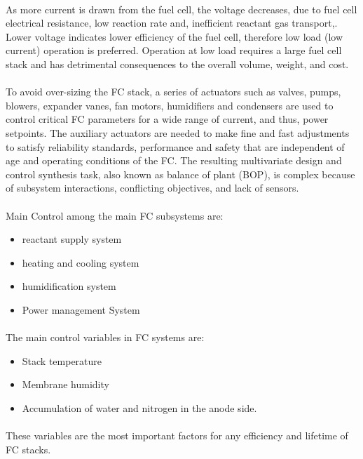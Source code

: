 \paragraph{}As more current is drawn from the fuel cell, the voltage decreases, due to fuel cell electrical resistance, low reaction rate and, inefficient reactant gas transport,. Lower voltage indicates lower efficiency of the fuel cell, therefore low load (low current) operation is preferred. Operation at low load requires a large fuel cell stack and has detrimental consequences to the overall volume, weight, and cost.
\paragraph{}To avoid over-sizing the FC stack, a series of actuators such as valves, pumps, blowers, expander vanes, fan motors, humidifiers and condensers are used to control critical FC parameters for a wide range of current, and thus, power setpoints. The auxiliary actuators are needed to make fine and fast adjustments to satisfy reliability standards, performance and safety that are independent of age and operating conditions of the FC. The resulting multivariate design and control synthesis task, also known as balance of plant (BOP), is complex because of subsystem interactions, conflicting objectives, and lack of sensors.
\paragraph{}Main Control among the main FC subsystems are:
\begin{itemize}
\item reactant supply system
\item heating and cooling system
\item humidification system
\item Power management System
\end{itemize}
\paragraph{}The main control variables in FC systems are: 
\begin{itemize}
\item Stack temperature
\item Membrane humidity
\item Accumulation of water and nitrogen in the anode side. 
\end{itemize}
\paragraph{}These variables are the most important factors for any efficiency and lifetime of FC stacks.
